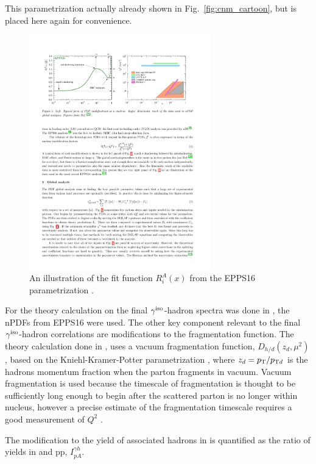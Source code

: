 This parametrization actually already shown in Fig.~\ref{fig:cnm_cartoon}, but is placed here again for convenience.

\begin{figure}[htpb]
  \centering
  \includegraphics[width=0.7\textwidth]{Introduction/cnm_cartoon}
  \caption{An illustration of the fit function $R_{i}^{A}(x)$ from the EPPS16 parametrization \cite{epps16:2017}.}
  \label{fig:cnm_cartoon_2}
\end{figure}

For the theory calculation on the final $\gamma^\mathrm{iso}$-hadron spectra was done in \cite{Xie2021}, the nPDFs from EPPS16 were used. The other key component relevant to the final $\gamma^\mathrm{iso}$-hadron correlations are modifications to the fragmentation function. The theory calculation done in \cite{Xie2021}, uses a vacuum fragmentation function, $D_{h / d}\left(z_{d}, \mu^{2}\right)$, based on the Kniehl-Kramer-Potter parametrization \cite{Kniehl2000}, where $z_d=p_{\mathrm{T}}/p_{\mathrm{T}d}$ is the hadrons momentum fraction when the parton fragments in vacuum. Vacuum fragmentation is used because the timescale of fragmentation is thought to be sufficiently long enough to begin after the scattered parton is no longer within nucleus, however a precise estimate of the fragmentation timescale requires a good measurement of $Q^2$ \cite{Sasabe1980}.

The modification to the yield of associated hadrons in \pPb is quantified as the ratio of yields in \pPb and pp, $I_{pA}^{\gamma h}$. %

